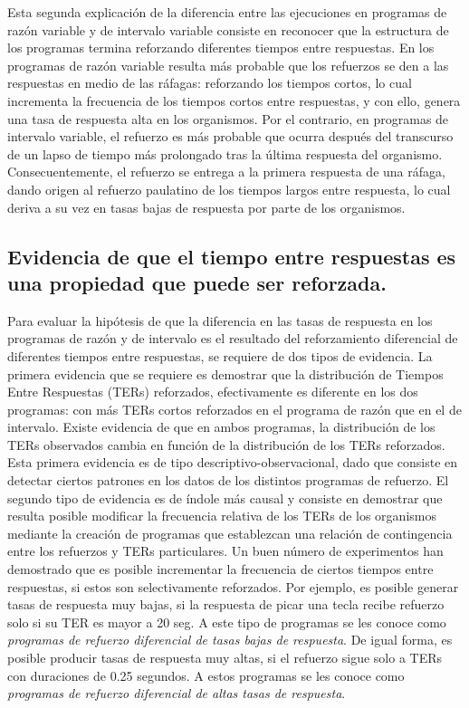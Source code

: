 \documentclass[
  letterpaper,
]{book}
\begin{document}
Esta segunda explicación de la diferencia entre las ejecuciones en
programas de razón variable y de intervalo variable consiste en
reconocer que la estructura de los programas termina reforzando
diferentes tiempos entre respuestas. En los programas de razón variable
resulta más probable que los refuerzos se den a las respuestas en medio
de las ráfagas: reforzando los tiempos cortos, lo cual incrementa la
frecuencia de los tiempos cortos entre respuestas, y con ello, genera
una tasa de respuesta alta en los organismos. Por el contrario, en
programas de intervalo variable, el refuerzo es más probable que ocurra
después del transcurso de un lapso de tiempo más prolongado tras la
última respuesta del organismo. Consecuentemente, el refuerzo se entrega
a la primera respuesta de una ráfaga, dando origen al refuerzo paulatino
de los tiempos largos entre respuesta, lo cual deriva a su vez en tasas
bajas de respuesta por parte de los organismos.

\subsection{Evidencia de que el tiempo entre respuestas es una propiedad
que puede ser
reforzada.}\label{evidencia-de-que-el-tiempo-entre-respuestas-es-una-propiedad-que-puede-ser-reforzada.}

Para evaluar la hipótesis de que la diferencia en las tasas de respuesta
en los programas de razón y de intervalo es el resultado del
reforzamiento diferencial de diferentes tiempos entre respuestas, se
requiere de dos tipos de evidencia. La primera evidencia que se requiere
es demostrar que la distribución de Tiempos Entre Respuestas (TERs)
reforzados, efectivamente es diferente en los dos programas: con más
TERs cortos reforzados en el programa de razón que en el de intervalo.
Existe evidencia de que en ambos programas, la distribución de los TERs
observados cambia en función de la distribución de los TERs reforzados.
Esta primera evidencia es de tipo descriptivo-observacional, dado que
consiste en detectar ciertos patrones en los datos de los distintos
programas de refuerzo. El segundo tipo de evidencia es de índole más
causal y consiste en demostrar que resulta posible modificar la
frecuencia relativa de los TERs de los organismos mediante la creación
de programas que establezcan una relación de contingencia entre los
refuerzos y TERs particulares. Un buen número de experimentos han
demostrado que es posible incrementar la frecuencia de ciertos tiempos
entre respuestas, si estos son selectivamente reforzados. Por ejemplo,
es posible generar tasas de respuesta muy bajas, si la respuesta de
picar una tecla recibe refuerzo solo si su TER es mayor a 20 seg. A este
tipo de programas se les conoce como \emph{programas de refuerzo
diferencial de tasas bajas de respuesta}. De igual forma, es posible
producir tasas de respuesta muy altas, si el refuerzo sigue solo a TERs
con duraciones de 0.25 segundos. A estos programas se les conoce como
\emph{programas de refuerzo diferencial de altas tasas de respuesta}.
\end{document}
